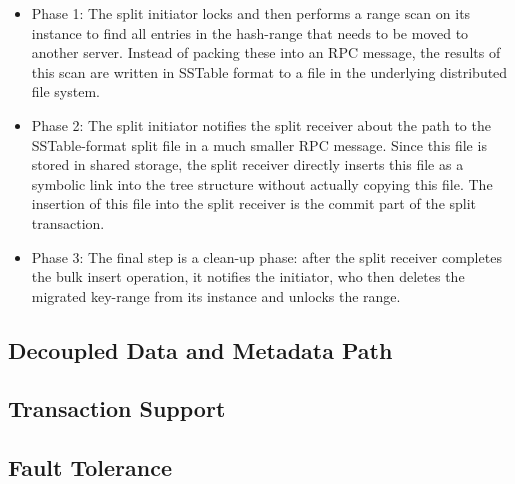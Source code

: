 \begin{itemize}
\item{Phase 1:} The split initiator locks and
then performs a range scan on its \ldb instance
to find all entries in the hash-range that needs to be moved to another server.
Instead of packing these into an RPC message,
the results of this scan are written in SSTable format to a file in the
underlying distributed file system.

\item{Phase 2:} The split initiator notifies the split receiver about
the path to the SSTable-format split file in a much smaller RPC message.
Since this file is stored in shared storage,
the split receiver directly inserts this file as a symbolic link
into the \ldb tree structure without actually copying this file.
The insertion of this file into the split receiver is the commit
part of the split transaction.

\item{Phase 3:} The final step is a clean-up phase:
after the split receiver completes the bulk insert operation, it notifies the
initiator, who then deletes the migrated key-range from its \ldb instance
and unlocks the range.
\end{itemize}


\subsection{Decoupled Data and Metadata Path}
\label{design.decouple}

\subsection{Transaction Support}

\subsection{Fault Tolerance}

